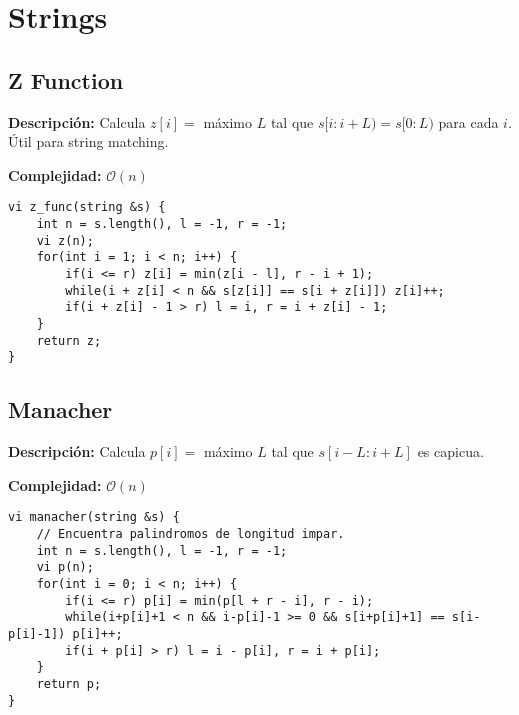 \documentclass[twocolumn]{article}
\begin{document}
\section{Strings}
\subsection{Z Function}
\begin{footnotesize}{\bf Descripción: } Calcula $z[i] = $ máximo $L$ tal que $s[i : i + L) = s[0 : L)$ para cada $i$. Útil para string matching.


{\bf Complejidad: } $\mathcal{O}(n)$
\end{footnotesize}\lstset{basicstyle=\footnotesize\ttfamily,breaklines=true,tabsize=2,language=C++,frame=leftline, numbers=left, numberstyle=\tiny, numbersep=5pt}
\begin{lstlisting}
vi z_func(string &s) {
	int n = s.length(), l = -1, r = -1;
	vi z(n);
	for(int i = 1; i < n; i++) {
		if(i <= r) z[i] = min(z[i - l], r - i + 1);
		while(i + z[i] < n && s[z[i]] == s[i + z[i]]) z[i]++;
		if(i + z[i] - 1 > r) l = i, r = i + z[i] - 1;
	}
	return z;
}
\end{lstlisting}
\subsection{Manacher}
\begin{footnotesize}{\bf Descripción: } Calcula $p[i] = $ máximo $L$ tal que $s[i - L : i + L]$ es capicua.


{\bf Complejidad: } $\mathcal{O}(n)$
\end{footnotesize}\lstset{basicstyle=\footnotesize\ttfamily,breaklines=true,tabsize=2,language=C++,frame=leftline, numbers=left, numberstyle=\tiny, numbersep=5pt}
\begin{lstlisting}
vi manacher(string &s) {
	// Encuentra palindromos de longitud impar.
	int n = s.length(), l = -1, r = -1;
	vi p(n);
	for(int i = 0; i < n; i++) {
		if(i <= r) p[i] = min(p[l + r - i], r - i);
		while(i+p[i]+1 < n && i-p[i]-1 >= 0 && s[i+p[i]+1] == s[i-p[i]-1]) p[i]++;
		if(i + p[i] > r) l = i - p[i], r = i + p[i];
	}
	return p;
}
\end{lstlisting}
\end{document}
